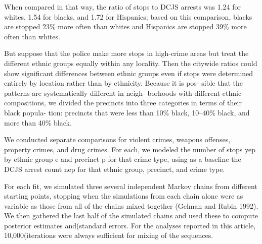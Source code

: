 \documentclass[]{article}
\begin{document}
When compared in that way, the ratio of stops to DCJS arrests was 1.24
for whites, 1.54 for blacks, and 1.72 for Hispanics; based on this
comparison, blacks are stopped 23\% more often than whites and Hispanics
are stopped 39\% more often than whites.

But suppose that the police make more stops in high-crime areas but
treat the different ethnic groups equally within any locality. Then the
citywide ratios could show significant differences between ethnic groups
even if stops were determined entirely by location rather than by
ethnicity. Because it is pos- sible that the patterns are systematically
different in neigh- borhoods with different ethnic compositions, we
divided the precincts into three categories in terms of their black
popula- tion: precincts that were less than 10\% black, 10--40\% black,
and more than 40\% black.

We conducted separate comparisons for violent crimes, weapons offenses,
property crimes, and drug crimes. For each, we modeled the number of
stops yep by ethnic group e and precinct p for that crime type, using as
a baseline the DCJS arrest count nep for that ethnic group, precinct,
and crime type.

For each fit, we simulated three several independent Markov chains from
different starting points, stopping when the simulations from each chain
alone were as variable as those from all of the chains mixed together
(Gelman and Rubin 1992). We then gathered the last half of the simulated
chains and used these to compute posterior estimates and(standard
errors. For the analyses reported in this article, 10,000(iterations
were always sufficient for mixing of the sequences.
\end{document}
